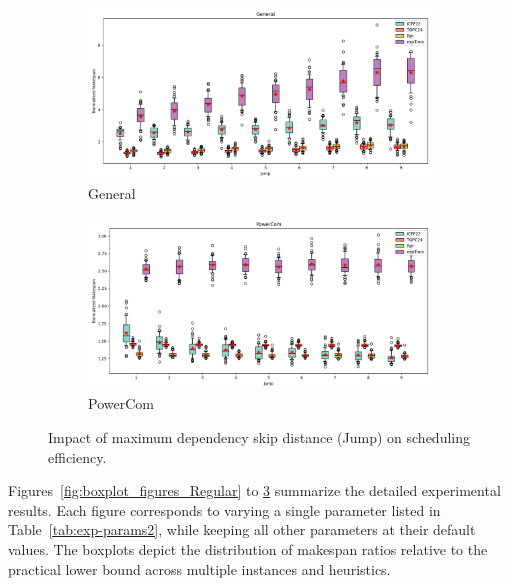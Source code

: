 \documentclass{article}
\begin{document}
\begin{figure}[htbp]
\\[2ex]
\begin{subfigure}[b]{0.32\textwidth}\includegraphics[width=\textwidth]{Results/Jump/Jump_General_boxplot}\caption{General}\label{fig:boxplot_figures_Jump_General}\end{subfigure}
\hfill
\begin{subfigure}[b]{0.32\textwidth}\includegraphics[width=\textwidth]{Results/Jump/Jump_PowerCom_boxplot}\caption{PowerCom}\label{fig:boxplot_figures_Jump_PowerCom}\end{subfigure}
\hfill
\caption{Impact of maximum dependency skip distance (Jump) on scheduling efficiency.}
\label{fig:boxplot_figures_Jump}
\end{figure}


\FloatBarrier 

Figures~\ref{fig:boxplot_figures_Regular} to \ref{fig:boxplot_figures_Jump} summarize the detailed experimental results. Each figure corresponds to varying a single parameter listed in Table~\ref{tab:exp-params2}, while keeping all other parameters at their default values. The boxplots depict the distribution of makespan ratios relative to the practical lower bound across multiple instances and heuristics.
\end{document}
